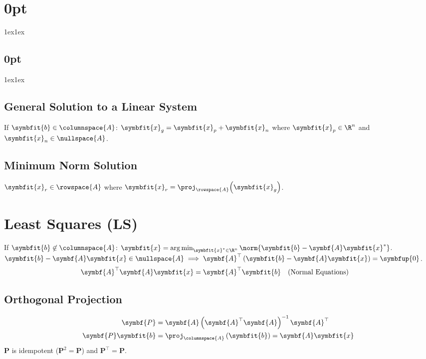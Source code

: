 \documentclass{article}
\DeclareMathOperator*{\argmin}{arg\,min}
\begin{document}
\titlespacing*\section{0pt}{1ex}{1ex}
\titlespacing*\subsection{0pt}{1ex}{1ex}
%
\setlength\abovecaptionskip{8pt}
\setlength\belowcaptionskip{-15pt}
\setlength\textfloatsep{0pt}
%
\setlength\abovedisplayskip{1pt}
\setlength\belowdisplayskip{1pt}

\begin{multicols*}{3}
    \subsection{General Solution to a Linear System}
    If \(\symbfit{b} \in \columnspace{A}\): \(\symbfit{x}_g = \symbfit{x}_p + \symbfit{x}_n\)
    where \(\symbfit{x}_p \in \R^n\) and \(\symbfit{x}_n \in \nullspace{A}\).
    \subsection{Minimum Norm Solution}
    \(\symbfit{x}_r \in \rowspace{A}\) where \(\symbfit{x}_r = \proj_{\rowspace{A}}{\left( \symbfit{x}_g \right)}\).
    \section{Least Squares (LS)}
    If \(\symbfit{b} \not\in \columnspace{A}\): \(\symbfit{x} = \argmin_{\symbfit{x}^\ast \in \R^n} \norm{\symbfit{b} - \symbf{A}\symbfit{x}^\ast}\).
    \(\symbfit{b} - \symbf{A} \symbfit{x} \in \nullspace{A} \implies \symbf{A}^\top \left( \symbfit{b} - \symbf{A}\symbfit{x} \right) = \symbfup{0}\).
    \begin{align*}
        \symbf{A}^\top \symbf{A}\symbfit{x} & = \symbf{A}^\top \symbfit{b} &  & \text{(Normal Equations)}
    \end{align*}
    \subsection{Orthogonal Projection}
    \begin{align*}
        \symbf{P}             & = \symbf{A} \left( \symbf{A}^\top \symbf{A} \right)^{-1} \symbf{A}^\top     \\
        \symbf{P} \symbfit{b} & = \proj_{\columnspace{A}} \left( \symbfit{b} \right) = \symbf{A}\symbfit{x}
    \end{align*}
    \(\symbf{P}\) is idempotent (\(\symbf{P}^2 = \symbf{P}\)) and \(\symbf{P}^\top = \symbf{P}\).

\end{multicols*}
\end{document}
